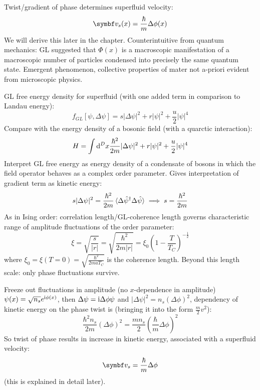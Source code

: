 \documentclass[../notes.tex]{subfiles}
\begin{document}
Twist/gradient of phase determines superfluid velocity:
\begin{equation}
	\vb{v}_s (x) = \frac{\hbar}{m} \Delta \phi (x)
\end{equation}
We will derive this later in the chapter.
Counterintuitive from quantum mechanics: GL suggested that \(\Phi(x)\) is a macroscopic manifestation of a macroscopic number of particles condensed into precisely the same quantum state.
Emergent phenomenon, collective properties of mater not a-priori evident from microscopic physics.

GL free energy density for superfluid (with one added term in comparison to Landau energy):
\begin{equation}
	f_{GL} [\psi, \Delta \psi] = s \vert \Delta \psi \vert^2 + r \vert \psi \vert^2 + \frac{u}{2} \vert \psi \vert^4
\end{equation}
Compare with the energy density of a bosonic field (with a quarctic interaction):
\begin{align}
	H = \int \odif[order=D]{x} \frac{\hbar^2}{2m} \vert \Delta \psi \vert^2 + r \vert \psi \vert^2 + \frac{u}{2} \vert \psi \vert^4
\end{align}
Interpret GL free energy as energy density of a condensate of bosons in which the field operator behaves as a complex order parameter.
Gives interpretation of gradient term as kinetic energy:
\begin{equation}
	s \vert \Delta \psi \vert^2 = \frac{\hbar^2}{2m} \braket{\Delta \hat{\psi}^{\dagger} \Delta \hat{\psi}} \implies s = \frac{\hbar^2}{2m}
\end{equation}
As in Ising order: correlation length/GL-coherence length governs characteristic range of amplitude fluctuations of the order parameter:
\begin{equation}
	\xi = \sqrt{\frac{s}{\vert r \vert}} = \sqrt{\frac{\hbar^2}{2m \vert r \vert}} = \xi_0 (1 - \frac{T}{T_C})^{-\frac{1}{2}}
\end{equation}
where \(\xi_0 = \xi(T=0) = \sqrt{\frac{\hbar^2}{2 m a T_C}}\) is the coherence length.
Beyond this length scale: only phase fluctuations survive.

Freeze out fluctuations in amplitude (no \(x\)-dependence in amplitude) \(\psi(x) = \sqrt{n_s} e^{\mathrm{i} \phi(x)}\), then \(\Delta \psi = \mathrm{i} \Delta \phi \psi\) and \(\vert \Delta \psi \vert^2 = n_s (\Delta \phi)^2\), dependency of kinetic energy on the phase twist is (bringing it into the form \(\frac{m}{2} v^2\)):
\begin{equation}
	\frac{\hbar^2 n_s}{2m} (\Delta \phi)^2 = \frac{m n_s}{2} (\frac{\hbar}{m} \Delta \phi)^2
\end{equation}
So twist of phase results in increase in kinetic energy, associated with a superfluid velocity:
\begin{equation}
	\vb{v}_s = \frac{\hbar}{m} \Delta \phi
\end{equation}
(this is explained in detail later).
\end{document}
